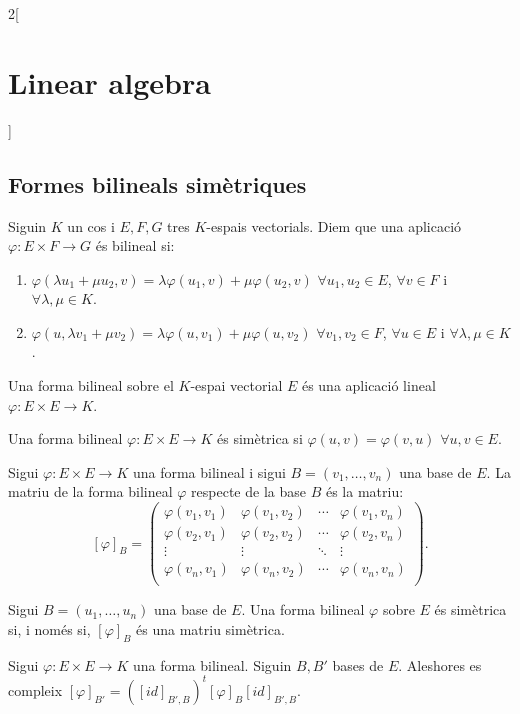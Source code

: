\documentclass[../../../main.tex]{subfiles}
\begin{document}
\begin{multicols}{2}[\section{Linear algebra}]
\subsection{Formes bilineals simètriques}
\begin{definition}
Siguin $K$ un cos i $E,F,G$ tres $K$-espais vectorials. Diem que una aplicació $\varphi:E\times F\rightarrow G$ és bilineal si:
\begin{enumerate}
    \item $\varphi(\lambda u_1+\mu u_2,v)=\lambda \varphi(u_1,v)+\mu \varphi(u_2,v)$ $\forall u_1,u_2\in E$, $\forall v\in F$ i $\forall\lambda,\mu\in K$.
    \item $\varphi(u,\lambda v_1+\mu v_2)=\lambda \varphi(u,v_1)+\mu \varphi(u,v_2)$ $\forall v_1,v_2\in F$, $\forall u\in E$ i $\forall\lambda,\mu\in K$.
\end{enumerate}
\end{definition}
\begin{definition}
Una forma bilineal sobre el $K$-espai vectorial $E$ és una aplicació lineal $\varphi:E\times E\rightarrow K$.
\end{definition}
\begin{definition}
Una forma bilineal $\varphi:E\times E\rightarrow K$ és simètrica si $\varphi(u,v)=\varphi(v,u)$ $\forall u,v\in E$.
\end{definition}
\begin{definition}
Sigui $\varphi:E\times E\rightarrow K$ una forma bilineal i sigui $B=(v_1,\ldots,v_n)$ una base de $E$. La matriu de la forma bilineal $\varphi$ respecte de la base $B$ és la matriu: $$[\varphi]_B=\begin{pmatrix}
\varphi(v_1,v_1) & \varphi(v_1,v_2) & \cdots & \varphi(v_1,v_n) \\
\varphi(v_2,v_1) & \varphi(v_2,v_2) & \cdots & \varphi(v_2,v_n) \\
\vdots & \vdots & \ddots & \vdots \\
\varphi(v_n,v_1) & \varphi(v_n,v_2) & \cdots & \varphi(v_n,v_n) \\
\end{pmatrix}.$$ 
\end{definition}
\begin{prop}
Sigui $B=(u_1,\ldots,u_n)$ una base de $E$. Una forma bilineal $\varphi$ sobre $E$ és simètrica si, i només si, $[\varphi]_B$ és una matriu simètrica.
\end{prop}
\begin{prop}
Sigui $\varphi:E\times E\rightarrow K$ una forma bilineal. Siguin $B,B'$ bases de $E$. Aleshores es compleix $[\varphi]_{B'}=([id]_{B',B})^t[\varphi]_B[id]_{B',B}$.

\end{prop}
\end{multicols}
\end{document}
